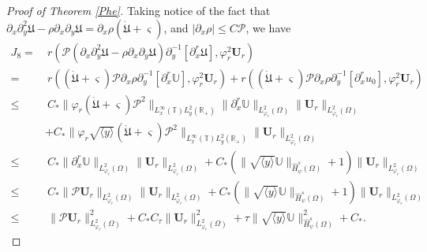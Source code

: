 \documentclass[10pt,a4paper]{amsart}
\newcommand\y{{{\langle y \rangle}}}
\begin{document}
\begin{proof}[Proof of Theorem \ref{Phe}]
Taking notice of the fact that $\partial_{x}\partial_{y}^{2}\mathfrak{U}-\rho\partial_{x}\partial_{y}\mathfrak{U}=\partial_{x}\rho(\dot{\mathfrak{U}}+\varsigma)$,
and $|\partial_{x}\rho|\leq C\mathcal{P}$, we have
\begin{align*}
J_{8}
=&~r\left(\mathcal{P}\left(\partial_{x}\partial_{y}^{2}\mathfrak{U}-\rho\partial_{x}\partial_{y}\mathfrak{U}\right)\partial_{y}^{-1}[\partial_{x}^{r}\mathfrak{U}],\varphi_{r}^{2}\mathbf{U}_{r}\right)\\
=&~r\left((\dot{\mathfrak{U}}+\varsigma)\mathcal{P}\partial_{x}\rho\partial_{y}^{-1}[\partial_{x}^{r}\mathbb{U}],\varphi_{r}^{2}\mathbf{U}_{r}\right)
  +r\left((\dot{\mathfrak{U}}+\varsigma)\mathcal{P}\partial_{x}\rho\partial_{y}^{-1}[\partial_{x}^{r}u_{0}],\varphi_{r}^{2}\mathbf{U}_{r}\right)\\
\leq&~C_{*}\|\varphi_{r}(\dot{\mathfrak{U}}+\varsigma)\mathcal{P}^{2}\|_{L_{x}^{\infty}(\mathbb{T})L_{y}^{2}(\mathbb{R_{+}})}
       \|\partial_{x}^{r}\mathbb{U}\|_{L_{\varphi_{r}}^{2}(\Omega)}\|\mathbf{U}_{r}\|_{L_{\varphi_{r}}^{2}(\Omega)}\\
    &+C_{*}\|\varphi_{r}\sqrt{\y}(\dot{\mathfrak{U}}+\varsigma)\mathcal{P}^{2}\|_{L_{x}^{\infty}(\mathbb{T})L_{y}^{2}(\mathbb{R_{+}})}
           \|\mathbf{U}_{r}\|_{L_{\varphi_{r}}^{2}(\Omega)}\\
\leq&~C_{*}\|\partial_{x}^{r}\mathbb{U}\|_{L_{\varphi_{r}}^{2}(\Omega)}\|\mathbf{U}_{r}\|_{L_{\varphi_{r}}^{2}(\Omega)}
     +C_{*}\left(\|\sqrt{\y}\mathbb{U}\|_{\hat{H}_{\psi}^{s}(\Omega)}+1\right)\|\mathbf{U}_{r}\|_{L_{\varphi_{r}}^{2}(\Omega)}\\
\leq&~C_{*}\|\mathcal{P}\mathbf{U}_{r}\|_{L_{\varphi_{r}}^{2}(\Omega)}\|\mathbf{U}_{r}\|_{L_{\varphi_{r}}^{2}(\Omega)}
     +C_{*}\left(\|\sqrt{\y}\mathbb{U}\|_{\hat{H}_{\psi}^{s}(\Omega)}+1\right)\|\mathbf{U}_{r}\|_{L_{\varphi_{r}}^{2}(\Omega)}\\
\leq&~\|\mathcal{P}\mathbf{U}_{r}\|_{L_{\varphi_{r}}^{2}(\Omega)}^{2}
     +C_{*}C_{\tau}\|\mathbf{U}_{r}\|_{L_{\varphi_{r}}^{2}(\Omega)}^{2}
     +\tau\|\sqrt{\y}\mathbb{U}\|_{\hat{H}_{\psi}^{s}(\Omega)}^{2}
     +C_{*}.
\end{align*}


\end{proof}
\end{document}
